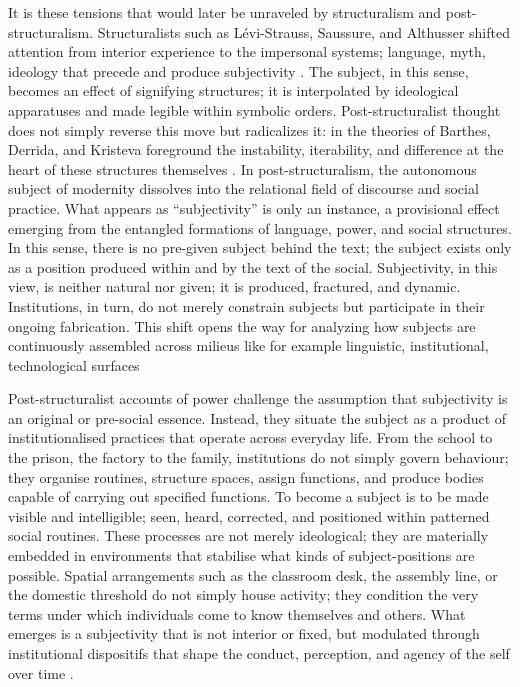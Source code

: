 \greensquare
It is these tensions that would later be unraveled by structuralism and post-structuralism. Structuralists such as Lévi-Strauss, Saussure, and Althusser shifted attention from interior experience to the impersonal systems; language, myth, ideology that precede and produce subjectivity \parencite{levi-strauss1963, saussure2011, althusser1977}. The subject, in this sense, becomes an effect of signifying structures; it is interpolated by ideological apparatuses and made legible within symbolic orders. Post-structuralist thought does not simply reverse this move but radicalizes it: in the theories of Barthes, Derrida, and Kristeva foreground the instability, iterability, and difference at the heart of these structures themselves \parencite{derrida2016, barthes1977, kristeva1980}. In post-structuralism, the autonomous subject of modernity dissolves into the relational field of discourse and social practice. What appears as “subjectivity” is only an instance, a provisional effect emerging from the entangled formations of language, power, and social structures. In this sense, there is no pre-given subject behind the text; the subject exists only as a position produced within and by the text of the social. Subjectivity, in this view, is neither natural nor given; it is produced, fractured, and dynamic. Institutions, in turn, do not merely constrain subjects but participate in their ongoing fabrication. This shift opens the way for analyzing how subjects are continuously assembled across milieus like for example linguistic, institutional, technological surfaces 

\redsquare
Post-structuralist accounts of power challenge the assumption that subjectivity is an original or pre-social essence. Instead, they situate the subject as a product of institutionalised practices that operate across everyday life. From the school to the prison, the factory to the family, institutions do not simply govern behaviour; they organise routines, structure spaces, assign functions, and produce bodies capable of carrying out specified functions. To become a subject is to be made visible and intelligible; seen, heard, corrected, and positioned within patterned social routines. These processes are not merely ideological; they are materially embedded in environments that stabilise what kinds of subject-positions are possible. Spatial arrangements such as the classroom desk, the assembly line, or the domestic threshold do not simply house activity; they condition the very terms under which individuals come to know themselves and others. What emerges is a subjectivity that is not interior or fixed, but modulated through institutional dispositifs that shape the conduct, perception, and agency of the self over time \parencite{foucault1995, hardt1998}.


